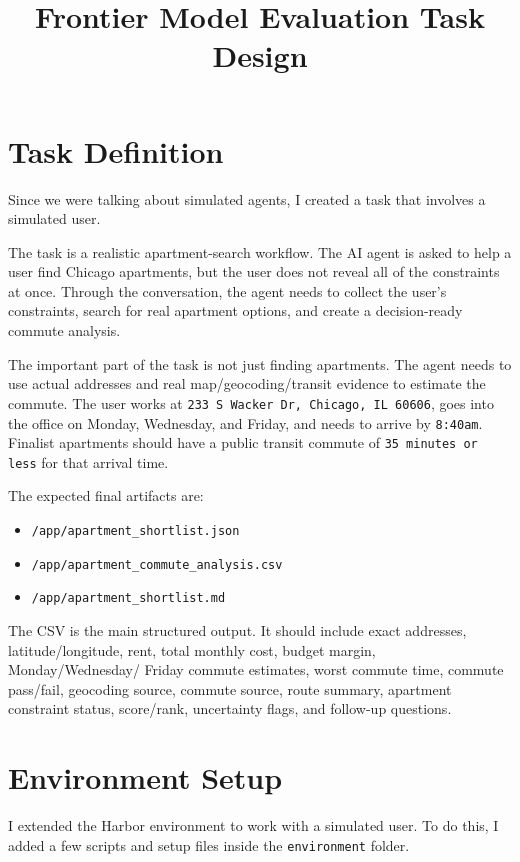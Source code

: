 \documentclass[11pt]{article}
\title{Frontier Model Evaluation Task Design}
\author{}
\date{}
\begin{document}
\maketitle

\section{Task Definition}

Since we were talking about simulated agents, I created a task that involves a
simulated user.

The task is a realistic apartment-search workflow. The AI agent is asked to
help a user find Chicago apartments, but the user does not reveal all of the
constraints at once. Through the conversation, the agent needs to collect the
user's constraints, search for real apartment options, and create a
decision-ready commute analysis.

The important part of the task is not just finding apartments. The agent needs
to use actual addresses and real map/geocoding/transit evidence to estimate the
commute. The user works at \texttt{233 S Wacker Dr, Chicago, IL 60606}, goes
into the office on Monday, Wednesday, and Friday, and needs to arrive by
\texttt{8:40am}. Finalist apartments should have a public transit commute of
\texttt{35 minutes or less} for that arrival time.

The expected final artifacts are:

\begin{itemize}
  \item \texttt{/app/apartment\_shortlist.json}
  \item \texttt{/app/apartment\_commute\_analysis.csv}
  \item \texttt{/app/apartment\_shortlist.md}
\end{itemize}

The CSV is the main structured output. It should include exact addresses,
latitude/longitude, rent, total monthly cost, budget margin, Monday/Wednesday/
Friday commute estimates, worst commute time, commute pass/fail, geocoding
source, commute source, route summary, apartment constraint status, score/rank,
uncertainty flags, and follow-up questions.

\section{Environment Setup}

I extended the Harbor environment to work with a simulated user. To do this, I
added a few scripts and setup files inside the \texttt{environment} folder.
\end{document}
